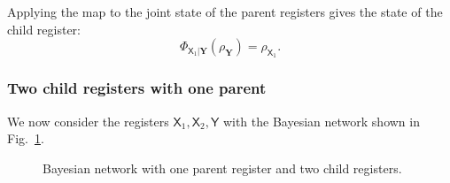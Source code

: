 \documentclass[
    aps,
    pra,
    reprint,
    superscriptaddress,
    nofootinbib
]{revtex4-2}
\theoremstyle{definition}
\theoremstyle{plain}
\begin{document}
Applying the map to the joint state of the parent registers gives the
state of the child register:
\begin{equation}
    \Phi_{\mathsf{X}_{1}|\mathbf{Y}}
    \left(\rho_{\mathbf{Y}}\right)
    =
    \rho_{\mathsf{X}_{1}}.
\end{equation}

\subsubsection{Two child registers with one parent}
\label{subsubsec:BN2}
We now consider the registers
$\mathsf{X}_{1},\mathsf{X}_{2},\mathsf{Y}$ with the Bayesian network shown
in Fig.~\ref{fig:bn2}.

\begin{figure}[ht]
    \centering
    \caption{Bayesian network with one parent register and two child
    registers.}
    \label{fig:bn2}
    \end{figure}
\end{document}
